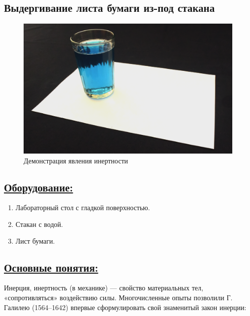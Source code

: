 \documentclass[14pt,a4paper,oneside]{extarticle}	%
\begin{document}

\begin{center}
	\section*{Выдергивание листа бумаги из-под стакана}
\end{center}

\begin{figure}[H] 	
	\centering 	
	\includegraphics[width=0.9\linewidth]{inertia-1.png}
	\caption{Демонстрация явления инертности}
\end{figure}

\subsection*{\underline{Оборудование:}}

\begin{enumerate}
\item Лабораторный стол с гладкой поверхностью.
\item Стакан с водой.
\item Лист бумаги.
\end{enumerate}

\newpage
\subsection*{\underline{Основные понятия:}}

Инерция, инертность (в механике) — свойство материальных тел, «сопротивляться» воздействию силы.
Многочисленные опыты позволили Г. Галилею (1564–1642) впервые сформулировать свой знаменитый закон инерции:
\end{document}
